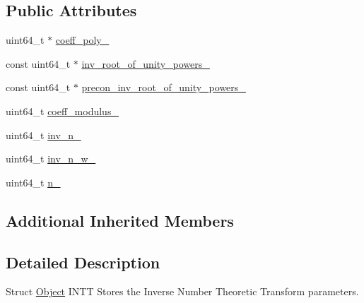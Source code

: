 \subsection*{Public Attributes}
\begin{DoxyCompactItemize}
\item 
uint64\-\_\-t $\ast$ \hyperlink{structintel_1_1hexl_1_1fpga_1_1Object__INTT_a4193d2648e27da868ba8790083a6b749}{coeff\-\_\-poly\-\_\-}
\item 
const uint64\-\_\-t $\ast$ \hyperlink{structintel_1_1hexl_1_1fpga_1_1Object__INTT_a4821a007e352a4f2f5eff215476f2d5f}{inv\-\_\-root\-\_\-of\-\_\-unity\-\_\-powers\-\_\-}
\item 
const uint64\-\_\-t $\ast$ \hyperlink{structintel_1_1hexl_1_1fpga_1_1Object__INTT_a916b6af204fa6a6236b3d7a332bb9999}{precon\-\_\-inv\-\_\-root\-\_\-of\-\_\-unity\-\_\-powers\-\_\-}
\item 
uint64\-\_\-t \hyperlink{structintel_1_1hexl_1_1fpga_1_1Object__INTT_a32f41552e25ee8102e9844040a3dbce5}{coeff\-\_\-modulus\-\_\-}
\item 
uint64\-\_\-t \hyperlink{structintel_1_1hexl_1_1fpga_1_1Object__INTT_a3b21373f1684a50b92b48938b3705fd8}{inv\-\_\-n\-\_\-}
\item 
uint64\-\_\-t \hyperlink{structintel_1_1hexl_1_1fpga_1_1Object__INTT_a09781e11982cbac5a01a16610f725f79}{inv\-\_\-n\-\_\-w\-\_\-}
\item 
uint64\-\_\-t \hyperlink{structintel_1_1hexl_1_1fpga_1_1Object__INTT_a3e0c80ff67c84bbae44082bca8a6a1f5}{n\-\_\-}
\end{DoxyCompactItemize}
\subsection*{Additional Inherited Members}


\subsection{Detailed Description}
Struct \hyperlink{structintel_1_1hexl_1_1fpga_1_1Object}{Object} I\-N\-T\-T Stores the Inverse Number Theoretic Transform parameters. 


